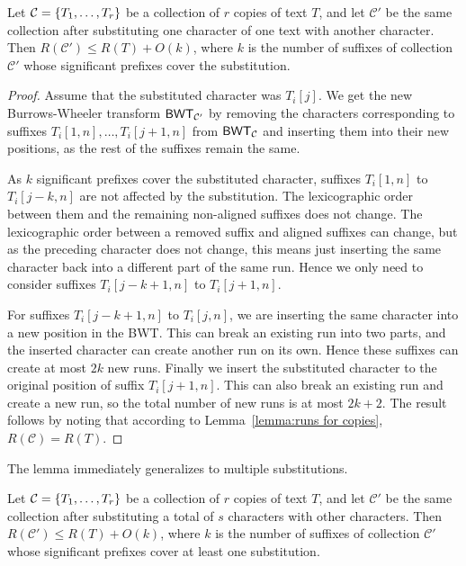 \begin{lemma}\label{lemma:one mutation}
Let $\mathcal{C} = \{ T_{1}, \dotsc, T_{r} \}$ be a collection of $r$ copies of text $T$, and let $\mathcal{C'}$ be the same collection after substituting one character of one text with another character. Then $R(\mathcal{C'}) \le R(T) + O(k)$, where $k$ is the number of suffixes of collection $\mathcal{C'}$ whose significant prefixes cover the substitution.
\end{lemma}

\begin{proof}
Assume that the substituted character was $T_{i}[j]$. We get the new Burrows-Wheeler transform $\mathsf{BWT}_{\mathcal{C'}}$ by removing the characters corresponding to suffixes $T_{i}[1,n], \dotsc, T_{i}[j+1,n]$ from $\mathsf{BWT}_{\mathcal{C}}$ and inserting them into their new positions, as the rest of the suffixes remain the same.

As $k$ significant prefixes cover the substituted character, suffixes $T_{i}[1,n]$ to $T_{i}[j-k,n]$ are not affected by the substitution. The lexicographic order between them and the remaining non-aligned suffixes does not change. The lexicographic order between a removed suffix and aligned suffixes can change, but as the preceding character does not change, this means just inserting the same character back into a different part of the same run. Hence we only need to consider suffixes $T_{i}[j-k+1,n]$ to $T_{i}[j+1,n]$.

For suffixes $T_{i}[j-k+1,n]$ to $T_{i}[j,n]$, we are inserting the same character into a new position in the BWT. This can break an existing run into two parts, and the inserted character can create another run on its own. Hence these suffixes can create at most $2k$ new runs. Finally we insert the substituted character to the original position of suffix $T_{i}[j+1,n]$. This can also break an existing run and create a new run, so the total number of new runs is at most $2k+2$. The result follows by noting that according to Lemma~\ref{lemma:runs for copies}, $R(\mathcal{C}) = R(T)$.
\end{proof}

The lemma immediately generalizes to multiple substitutions.

\begin{corollary}\label{corollary:many mutations}
Let $\mathcal{C} = \{ T_{1}, \dotsc, T_{r} \}$ be a collection of $r$ copies of text $T$, and let $\mathcal{C'}$ be the same collection after substituting a total of $s$ characters with other characters. Then $R(\mathcal{C'}) \le R(T) + O(k)$, where $k$ is the number of suffixes of collection $\mathcal{C'}$ whose significant prefixes cover at least one substitution.
\end{corollary}


